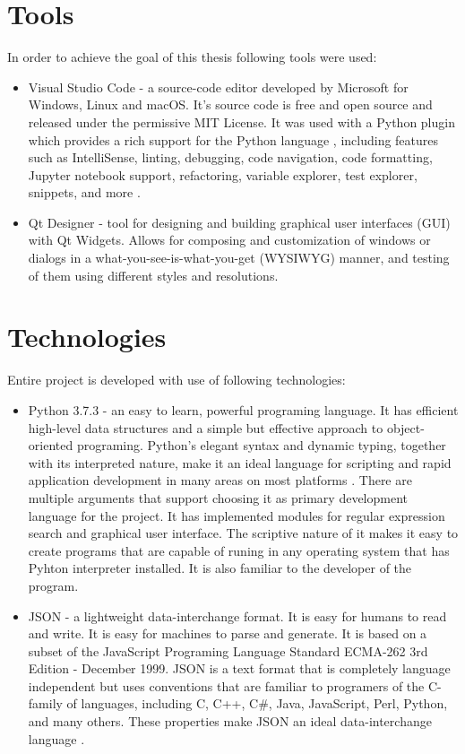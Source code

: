 \documentclass[a4paper,twoside,12pt]{book}
\begin{document}
\section{Tools}
In order to achieve the goal of this thesis following tools were used:
\begin{itemize}
   \item Visual Studio Code - a source-code editor developed by Microsoft for Windows, Linux and macOS. It's source code is free and open source and 
   released under the permissive MIT License. It was used with a Python plugin which provides a rich support for the Python language , including 
   features such as IntelliSense, linting, debugging, code navigation, code formatting, Jupyter notebook support, refactoring, variable explorer, 
   test explorer, snippets, and more \cite{bib:internetVSC}\cite{bib:internetVSCLicence}.
   \item Qt Designer - tool for designing and building graphical user interfaces (GUI) with Qt Widgets. Allows for composing and customization 
   of windows or dialogs in a what-you-see-is-what-you-get (WYSIWYG) manner, and testing of them using different styles and resolutions\cite{bib:internetQt}.
\end{itemize} 
\section{Technologies}
Entire project is developed with use of following technologies:
\begin{itemize}
   \item Python 3.7.3 - an easy to learn, powerful programing language. It has efficient high-level data structures 
   and a simple but effective approach to object-oriented programing. Python’s elegant syntax and dynamic typing, together with its interpreted nature, make it 
   an ideal language for scripting and rapid application development in many areas on most platforms \cite{bib:bookPython}. There are multiple arguments that support
   choosing it as primary development language for the project. It has implemented modules for regular expression search and graphical user interface.
   The scriptive nature of it makes it easy to create programs that are capable of runing in any operating system that has Pyhton interpreter installed.
   It is also familiar to the developer of the program.
   \item JSON - a lightweight data-interchange format. It is easy for humans to read and write. It is easy for machines to parse and generate. It is based on a
   subset of the JavaScript Programing Language Standard ECMA-262 3rd Edition - December 1999. JSON is a text format that is completely language independent but
   uses conventions that are familiar to programers of the C-family of languages, including C, C++, C\#, Java, JavaScript, Perl, Python, and many others. These
   properties make JSON an ideal data-interchange language \cite{bib:internetJSON}.
\end{itemize}
\end{document}
